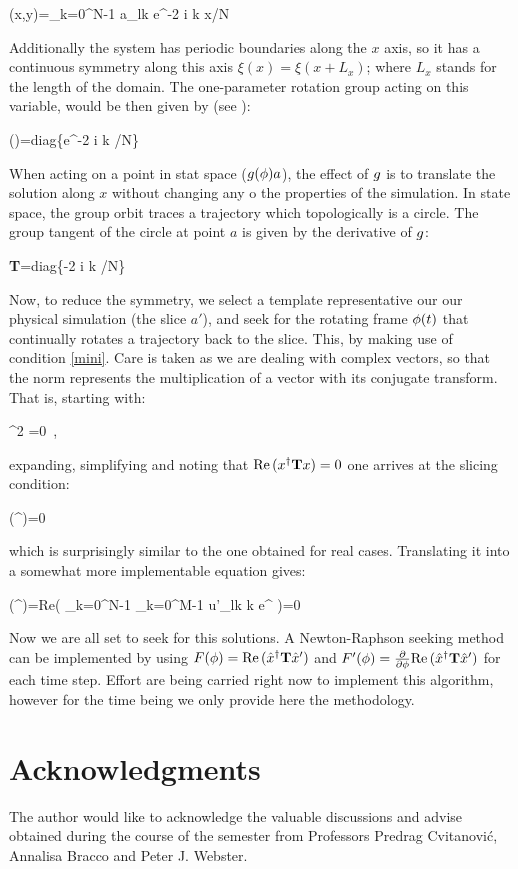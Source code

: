     \beq
    \xi(x,y)=\sum_{k=0}^{N-1} a_{lk} e^{-2 i \pi k x/N}

Additionally the system has periodic boundaries along the $x$ axis, so it has a continuous symmetry along this axis $\xi(x)=\xi(x+L_x)$; where $L_x$ stands for the length of the domain. The one-parameter rotation group acting on this variable, would be then given by (see ):

\beq
\LieEl(\gSpace)=\textrm{diag}\{e^{-2 i \pi k \gSpace/N}\}

When acting on a point in stat space ($g({\bf \phi}) a$), the effect of $g$ is to translate the solution along $x$ without changing any o the properties of the simulation. In state space, the group orbit traces a trajectory which topologically is a circle. The group tangent of the circle at point $a$ is given by the derivative of $g$:

\beq
\textbf{T}=\textrm{diag}\{-2 i \pi k /N\}

Now, to reduce the symmetry, we select a template representative our our physical simulation (the slice $a'$), and seek for the rotating frame ${\bf \phi}(t)$ that continually rotates a trajectory back to the slice. This, by making use of condition \ref{mini}. Care is taken as we are dealing with complex vectors, so that the norm represents the multiplication of a vector with its conjugate transform. That is, starting with:

\beq
\frac{\partial}{\partial \gSpace} \norm{\ssp-\LieEl\slicep}^2 =0
\,,

expanding, simplifying and noting that ${\rm Re}\,(x^\dagger \mathbf{T} x)=0$ one arrives at the slicing condition:

\beq
    \Re(\sspRed^\dagger \Lg \slicep)=0

which is surprisingly similar to the one obtained for real cases. Translating it into a somewhat more implementable equation gives:

\beq
    \Re(\sspRed^\dagger \Lg \slicep)=Re\left( \sum_{k=0}^{N-1} \sum_{k=0}^{M-1}  u'_{lk} k e^{ \gSpace}\right)=0

Now we are all set to seek for this solutions. A Newton-Raphson seeking method can be implemented by using $F({\bf \phi})={\rm Re}\,(\hat{x}^\dagger \mathbf{T} {\hat{x}'})$ and $F'({\bf \phi})=\frac{\partial}{\partial {\bf \phi}}{\rm Re}\,(\hat{x}^\dagger \mathbf{T} {\hat{x}'})$ for each time step. Effort are being carried right now to implement this algorithm, however for the time being we only provide here the methodology.

\section{Acknowledgments}
The author would like to acknowledge the valuable discussions and advise obtained during the course of the semester from Professors Predrag Cvitanovi{\'c}, Annalisa Bracco and Peter J. Webster. 
